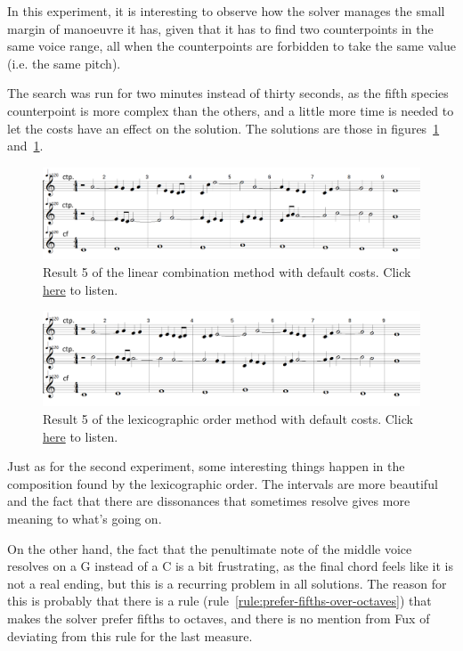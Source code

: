 In this experiment, it is interesting to observe how the solver manages the small margin of manoeuvre it has, given that it has to find two counterpoints in the same voice range, all when the counterpoints are forbidden to take the same value (i.e. the same pitch).

The search was run for two minutes instead of thirty seconds, as the fifth species counterpoint is more complex than the others, and a little more time is needed to let the costs have an effect on the solution. The solutions are those in figures~\ref{fig:combili-5sp} and~\ref{fig:combili-5sp}.

\begin{figure}[h]
    \centering
    \includegraphics[width=1\textwidth]{Images/Experiments/linear-combination-5sp.png}
    \caption{Result 5 of the linear combination method with default costs. Click \href{https://youtu.be/Lyi2Tv0eto8}{here} to listen.}
    \label{fig:combili-5sp}
\end{figure}

\begin{figure}[h]
    \centering
    \includegraphics[width=1\textwidth]{Images/Experiments/basic-lexico-5sp.png}
    \caption{Result 5 of the lexicographic order method with default costs. Click \href{https://youtu.be/wYq28XcmpVw}{here} to listen.}
    \label{fig:lexico-5sp}
\end{figure}

Just as for the second experiment, some interesting things happen in the composition found by the lexicographic order. The intervals are more beautiful and the fact that there are dissonances that sometimes resolve gives more meaning to what's going on.

On the other hand, the fact that the penultimate note of the middle voice resolves on a G instead of a C is a bit frustrating, as the final chord feels like it is not a real ending, but this is a recurring problem in all solutions. The reason for this is probably that there is a rule (rule~\ref{rule:prefer-fifths-over-octaves}) that makes the solver prefer fifths to octaves, and there is no mention from Fux of deviating from this rule for the last measure.


